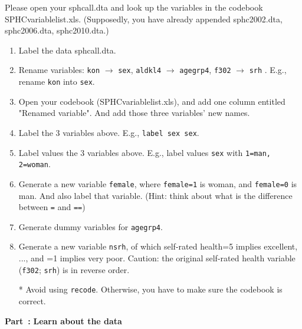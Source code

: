 \documentclass[11pt]{article}
\newcounter{Part}[section]
\newenvironment{Part}[1][]{\refstepcounter{Part}\par\medskip
   \noindent \large \textbf{Part~\thePart #1: }}{\medskip}
\begin{document}
\noindent Please open your sphc\textunderscore all.dta and look up the variables in the codebook SPHC\textunderscore variable\textunderscore list.xls. (Supposedly, you have already appended sphc\textunderscore 2002.dta, sphc\textunderscore 2006.dta, sphc\textunderscore 2010.dta.)
\begin{enumerate}
	\item Label the data sphc\textunderscore all.dta.
	\item Rename variables: \verb|kon| $\rightarrow$ \verb|sex|, \verb|aldkl4| $\rightarrow$ \verb|agegrp4|, \verb|f302| $\rightarrow$ \verb|srh| . E.g., rename \verb|kon| into \verb|sex|.
	\item Open your codebook (SPHC\textunderscore variable\textunderscore list.xls), and add one column entitled "Renamed variable". And add those three variables' new names. 
	\item Label the 3 variables above. E.g., \verb|label sex sex|.
	\item Label values the 3 variables above. E.g., label values \verb|sex| with \verb|1=man, 2=woman|. 
	\item Generate a new variable \verb|female|, where \verb|female=1| is woman, and \verb|female=0| is man. And also label that variable. (Hint: think about what is the difference between \verb|=| and \verb|==|)
	\item Generate dummy variables for \verb|agegrp4|. 
	\item Generate a new variable \verb|nsrh|, of which self-rated health=5 implies excellent, ..., and =1 implies very poor. Caution: the original self-rated health variable (\verb|f302|; \verb|srh|) is in reverse order.
	\item[*] Avoid using \verb|recode|. Otherwise, you have to make sure the codebook is correct. 
\end{enumerate}


\begin{Part}
\textbf{Learn about the data}
\end{Part} 
\end{document}
